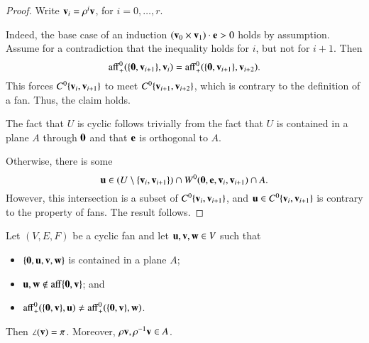 \begin{proof} 
Write ${\mathbf v}_i = \rho^i {\mathbf v}$, for $i=0,\ldots,r$.

Indeed, the base case of an induction  $({\mathbf v}_0\times {\mathbf v}_1)\cdot {\mathbf e} > 0$ holds by assumption.    
Assume for a contradiction that the inequality holds for $i$, but not for $i+1$.
Then 
$${\operatorname{aff}}^0_+(\{{\mathbf 0},{\mathbf v}_{i+1}\},{\mathbf v}_i) = {\operatorname{aff}}^0_+(\{{\mathbf 0},{\mathbf v}_{i+1}\},{\mathbf v}_{i+2}).$$ 
This forces $C^0\{{\mathbf v}_i,{\mathbf v}_{i+1}\}$ to meet $C^0\{{\mathbf v}_{i+1},{\mathbf v}_{i+2}\}$, which
is contrary to the definition of a fan.  Thus, the claim holds.

The fact that $U$ is cyclic follows trivially from the fact that $U$ is contained in a plane $A$ through ${\mathbf 0}$ and that ${\mathbf e}$ is orthogonal to $A$.

Otherwise, there is some 
$${\mathbf u} \in (U\setminus \{{\mathbf v}_i,{\mathbf v}_{i+1}\}) \cap W^0({\mathbf 0},{\mathbf e},{\mathbf v}_i,{\mathbf v}_{i+1}) \cap A.
$$
However, this intersection is a subset of $C^0\{{\mathbf v}_i,{\mathbf v}_{i+1}\}$,
and ${\mathbf u}\in C^0\{{\mathbf v}_i,{\mathbf v}_{i+1}\}$ is contrary to the property  of fans.  The result follows.
\end{proof}

\begin{lemma} \label{lemma:A}  Let $(V,E,F)$ be a cyclic fan and let
${\mathbf u},{\mathbf v},{\mathbf w}\in V$ such that
\begin{itemize}
\item $\{{\mathbf 0},{\mathbf u},{\mathbf v},{\mathbf w}\}$ is contained in a plane $A$; \vspace{3pt}
\item ${\mathbf u},{\mathbf w}\not\in{\operatorname{aff}}\{{\mathbf 0},{\mathbf v}\}$; and \vspace{3pt}
\item ${\operatorname{aff}}^0_+(\{{\mathbf 0},{\mathbf v}\},{\mathbf u}) \ne {\operatorname{aff}}^0_+(\{{\mathbf 0},{\mathbf v}\},{\mathbf w})$.
\end{itemize}
Then $\angle({\mathbf v}) = \pi$.  Moreover, $\rho {\mathbf v},\rho^{-1} {\mathbf v}\in A$.
\end{lemma}

